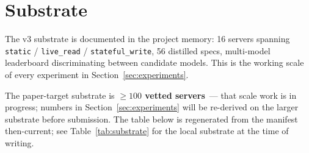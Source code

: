 \section{Substrate}
\label{sec:substrate}

The v3 substrate is documented in the project memory: 16 servers
spanning \texttt{static} / \texttt{live\_read} / \texttt{stateful\_write},
56 distilled specs, multi-model leaderboard discriminating between
candidate models. This is the working scale of every experiment in
Section~\ref{sec:experiments}.

The paper-target substrate is \textbf{$\geq 100$ vetted servers}~--- that
scale work is in progress; numbers in
Section~\ref{sec:experiments} will be re-derived on the larger
substrate before submission. The table below is regenerated from the
manifest then-current; see Table~\ref{tab:substrate} for the local
substrate at the time of writing.




